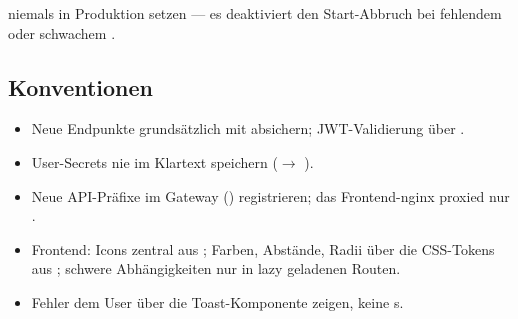 \begin{warnbox}
   niemals in Produktion setzen — es
  deaktiviert den Start-Abbruch bei fehlendem oder schwachem
  .
\end{warnbox}

\subsection{Konventionen}

\begin{itemize}
  \item Neue Endpunkte grundsätzlich mit 
    absichern; JWT-Validierung über .
  \item User-Secrets nie im Klartext speichern
    ($\to$ ).
  \item Neue API-Präfixe im Gateway () registrieren;
    das Frontend-nginx proxied nur .
  \item Frontend: Icons zentral aus ; Farben,
    Abstände, Radii über die CSS-Tokens aus ; schwere
    Abhängigkeiten nur in lazy geladenen Routen.
  \item Fehler dem User über die Toast-Komponente zeigen, keine
    s.
\end{itemize}
